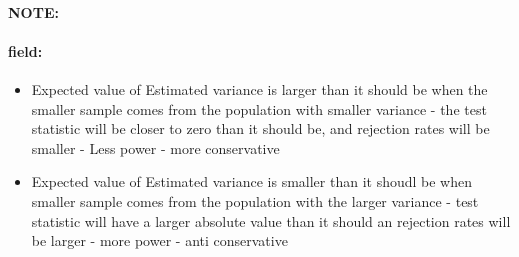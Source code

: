 \documentclass[12pt]{article}
\newenvironment{note}{\paragraph{NOTE:}}{}
\newenvironment{field}{\paragraph{field:}}{}
\begin{document}
\begin{note}
\begin{field}
\begin{itemize}
      \begin{itemize}
        \item Expected value of Estimated variance is larger than it should be when the smaller sample comes from the population with smaller variance - the test statistic will be closer to zero than it should be, and rejection rates will be smaller - Less power - more conservative
        \item Expected value of Estimated variance is smaller than it shoudl be when smaller sample comes from the population with the larger variance - test statistic will have a larger absolute value than it should an rejection rates will be larger  - more power - anti conservative
      \end{itemize}
    \end{itemize}
  \end{field}
\end{note}
\end{document}
